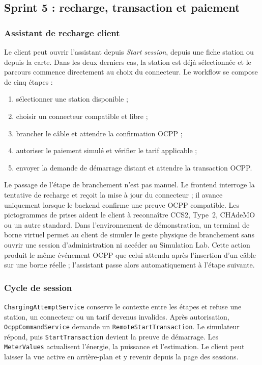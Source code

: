 \subsection{Sprint 5 : recharge, transaction et paiement}

\subsubsection{Assistant de recharge client}

Le client peut ouvrir l'assistant depuis \emph{Start session}, depuis une fiche
station ou depuis la carte. Dans les deux derniers cas, la station est déjà
sélectionnée et le parcours commence directement au choix du connecteur. Le
workflow se compose de cinq étapes :

\begin{enumerate}[leftmargin=8mm]
  \item sélectionner une station disponible ;
  \item choisir un connecteur compatible et libre ;
  \item brancher le câble et attendre la confirmation OCPP ;
  \item autoriser le paiement simulé et vérifier le tarif applicable ;
  \item envoyer la demande de démarrage distant et attendre la transaction OCPP.
\end{enumerate}

Le passage de l'étape de branchement n'est pas manuel. Le frontend interroge la
tentative de recharge et reçoit la mise à jour du connecteur ; il avance uniquement
lorsque le backend confirme une preuve OCPP compatible. Les pictogrammes de prises
aident le client à reconnaître CCS2, Type~2, CHAdeMO ou un autre standard.
Dans l'environnement de démonstration, un terminal de borne virtuel permet au
client de simuler le geste physique de branchement sans ouvrir une session
d'administration ni accéder au Simulation Lab. Cette action produit le même
événement OCPP que celui attendu après l'insertion d'un câble sur une borne
réelle ; l'assistant passe alors automatiquement à l'étape suivante.

\subsubsection{Cycle de session}

\texttt{ChargingAttemptService} conserve le contexte entre les étapes et refuse
une station, un connecteur ou un tarif devenus invalides. Après autorisation,
\texttt{OcppCommandService} demande un
\texttt{RemoteStartTransaction}. Le simulateur répond, puis
\texttt{StartTransaction} devient la preuve de démarrage. Les
\texttt{MeterValues} actualisent l'énergie, la puissance et l'estimation. Le
client peut laisser la vue active en arrière-plan et y revenir depuis la page des
sessions.

